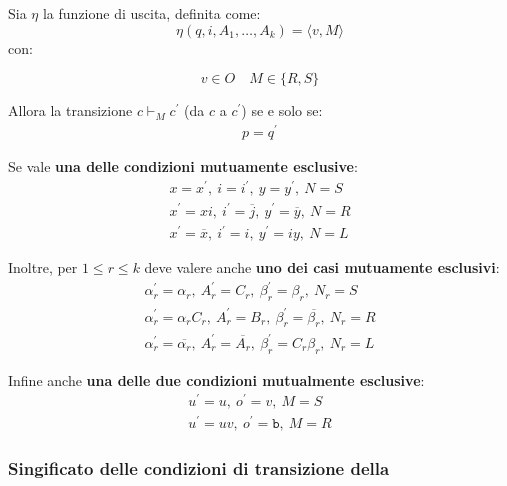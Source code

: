 \documentclass[italian, 10pt]{article}
\newcommand{\blank}{\texttt{b}} %
\begin{document}
\smallskip
Sia \(\eta\) la funzione di uscita, definita come:
\[ \eta (q, i, A_1, \ldots, A_k) = \langle v, M \rangle\]
con:

\[ v \in O \quad M \in \{R, S\}\]

\bigskip
Allora la transizione \(c \vdash_M c^\prime\) (da \(c\) a \(c^\prime\)) se e solo se:
\begin{gather}
  p = q^\prime \label{eq:transizione-TM-0}
\end{gather}

\bigskip
Se vale \textbf{una delle condizioni mutuamente esclusive}:
\begin{gather}
  x = x^\prime, \ i = i^\prime, \ y = y^\prime, \ N = S \label{eq:transizione-TM-1}                        \\
  x^\prime = xi, \ i^\prime = \overline{j}, \ y^\prime = \overline{y}, \ N = R \label{eq:transizione-TM-2} \\
  x^\prime = \overline{x}, \ i^\prime = i, \ y^\prime = iy, \ N = L \label{eq:transizione-TM-3}
\end{gather}

\bigskip
Inoltre, per \(1 \leq r \leq k\) deve valere anche \textbf{uno dei casi mutuamente esclusivi}:
\begin{gather}
  \alpha_r^\prime = \alpha_r, \ A_r^\prime = C_r, \ \beta_r^\prime = \beta_r, \ N_r = S \label{eq:transizione-TM-4}     \\
  \alpha_r^\prime = \alpha_r C_r, \ A_r^\prime = B_r, \ \beta_r^\prime = \overline{\beta_r}, \ N_r = R \label{eq:transizione-TM-5}     \\
  \alpha_r^\prime = \overline{\alpha_r}, \ A_r^\prime = \overline{A_r}, \ \beta_r^\prime = C_r \beta_r, \ N_r = L \label{eq:transizione-TM-6}
\end{gather}

\bigskip
Infine anche \textbf{una delle due condizioni mutualmente esclusive}:
\begin{gather}
  u^\prime = u, \ o^\prime = v, \ M = S \label{eq:transizione-TM-7} \\
  u^\prime = uv, \ o^\prime = \blank, \ M = R \label{eq:transizione-TM-8}
\end{gather}

\subsubsection{Singificato delle condizioni di transizione della \TM}
\end{document}

